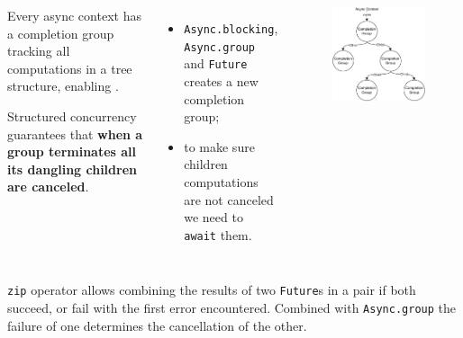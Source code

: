 \documentclass[aspectratio=1610,xcolor=dvipsnames,handout]{beamer}
\begin{document}
%
\begin{frame}
  \begin{columns}
      \begin{block}{}
        Every async context has a completion group tracking all computations in a tree structure, enabling . 

        Structured concurrency guarantees that \textbf{when a group terminates all its dangling children are canceled}.
      \end{block}
      \begin{itemize}
        \item \texttt{Async.blocking}, \texttt{Async.group} and \texttt{Future} creates a new completion group;
        \item to make sure children computations are not canceled we need to \texttt{await} them.
      \end{itemize}
      \begin{figure}
        \centering
        \includegraphics[width=\textwidth]{./images/structured-concurrency.pdf}
      \end{figure}
  \end{columns}
\end{frame}
%
\begin{frame}
  \small
  
  \texttt{zip} operator allows combining the results of two \texttt{Future}s in a pair if both succeed, or fail with the first error encountered. Combined with \texttt{Async.group} the failure of one determines the cancellation of the other.
\end{frame}
\end{document}
